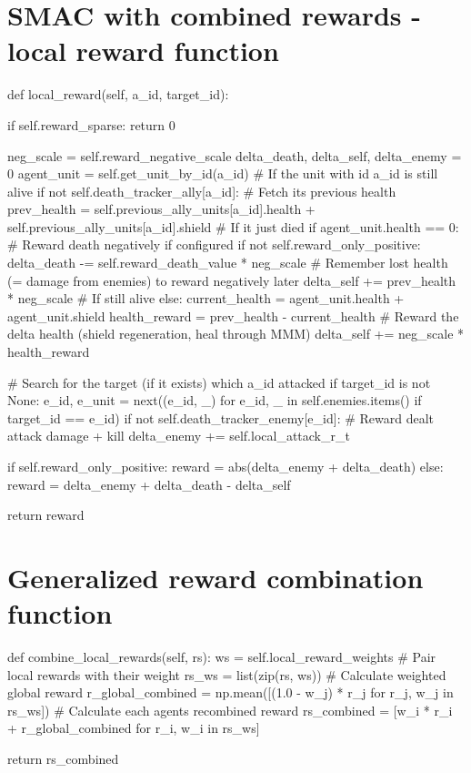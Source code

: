 \section{SMAC with combined rewards - local reward function} \label{sec:reward_local_python_code}
	\begin{python}
def local_reward(self, a_id, target_id):

	if self.reward_sparse:
		return 0

	neg_scale = self.reward_negative_scale
	delta_death, delta_self, delta_enemy = 0	
	agent_unit = self.get_unit_by_id(a_id)	
	# If the unit with id a_id is still alive
	if not self.death_tracker_ally[a_id]:
		# Fetch its previous health
		prev_health = self.previous_ally_units[a_id].health + self.previous_ally_units[a_id].shield
		# If it just died
		if agent_unit.health == 0:
		# Reward death negatively if configured
		if not self.reward_only_positive:
			delta_death -= self.reward_death_value * neg_scale
		# Remember lost health (= damage from enemies) to reward negatively later
			delta_self += prev_health * neg_scale
	# If still alive
	else:
		current_health = agent_unit.health + agent_unit.shield
		health_reward = prev_health - current_health
		# Reward the delta health (shield regeneration, heal through MMM)
		delta_self += neg_scale * health_reward
	
	# Search for the target (if it exists) which a_id attacked
	if target_id is not None:
		e_id, e_unit = next((e_id, _) for e_id, _ in self.enemies.items() if target_id == e_id)
		if not self.death_tracker_enemy[e_id]:
			# Reward dealt attack damage + kill
			delta_enemy += self.local_attack_r_t
	
	if self.reward_only_positive:
		reward = abs(delta_enemy + delta_death)
	else:
		reward = delta_enemy + delta_death - delta_self
	
	return reward
	\end{python}
\newpage
\section{Generalized reward combination function} \label{sec:reward_combination_code}
	\begin{python}
def combine_local_rewards(self, rs):
	ws = self.local_reward_weights
	# Pair local rewards with their weight
	rs_ws = list(zip(rs, ws))
	# Calculate weighted global reward
	r_global_combined = np.mean([(1.0 - w_j) * r_j for r_j, w_j in rs_ws])
	# Calculate each agents recombined reward
	rs_combined = [w_i * r_i + r_global_combined for r_i, w_i in rs_ws]
	
	return rs_combined
	\end{python}

